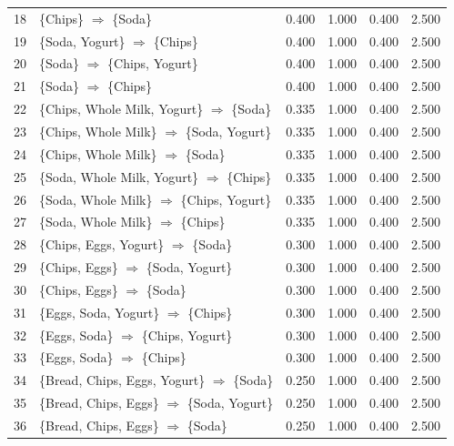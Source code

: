 \documentclass[12pt,letterpaper, onecolumn]{exam}
\begin{document}
\begin{questions}
\begin{solution}
{\begin{longtable}{|c|l|c|c|c|c|}
            18 & \{Chips\} $\Rightarrow$ \{Soda\} & 0.400 & 1.000 & 0.400 & 2.500 \\
            19 & \{Soda, Yogurt\} $\Rightarrow$ \{Chips\} & 0.400 & 1.000 & 0.400 & 2.500 \\
            20 & \{Soda\} $\Rightarrow$ \{Chips, Yogurt\} & 0.400 & 1.000 & 0.400 & 2.500 \\
            21 & \{Soda\} $\Rightarrow$ \{Chips\} & 0.400 & 1.000 & 0.400 & 2.500 \\
            22 & \{Chips, Whole Milk, Yogurt\} $\Rightarrow$ \{Soda\} & 0.335 & 1.000 & 0.400 & 2.500 \\
            23 & \{Chips, Whole Milk\} $\Rightarrow$ \{Soda, Yogurt\} & 0.335 & 1.000 & 0.400 & 2.500 \\
            24 & \{Chips, Whole Milk\} $\Rightarrow$ \{Soda\} & 0.335 & 1.000 & 0.400 & 2.500 \\
            25 & \{Soda, Whole Milk, Yogurt\} $\Rightarrow$ \{Chips\} & 0.335 & 1.000 & 0.400 & 2.500 \\
            26 & \{Soda, Whole Milk\} $\Rightarrow$ \{Chips, Yogurt\} & 0.335 & 1.000 & 0.400 & 2.500 \\
            27 & \{Soda, Whole Milk\} $\Rightarrow$ \{Chips\} & 0.335 & 1.000 & 0.400 & 2.500 \\
            28 & \{Chips, Eggs, Yogurt\} $\Rightarrow$ \{Soda\} & 0.300 & 1.000 & 0.400 & 2.500 \\
            29 & \{Chips, Eggs\} $\Rightarrow$ \{Soda, Yogurt\} & 0.300 & 1.000 & 0.400 & 2.500 \\
            30 & \{Chips, Eggs\} $\Rightarrow$ \{Soda\} & 0.300 & 1.000 & 0.400 & 2.500 \\
            31 & \{Eggs, Soda, Yogurt\} $\Rightarrow$ \{Chips\} & 0.300 & 1.000 & 0.400 & 2.500 \\
            32 & \{Eggs, Soda\} $\Rightarrow$ \{Chips, Yogurt\} & 0.300 & 1.000 & 0.400 & 2.500 \\
            33 & \{Eggs, Soda\} $\Rightarrow$ \{Chips\} & 0.300 & 1.000 & 0.400 & 2.500 \\
            34 & \{Bread, Chips, Eggs, Yogurt\} $\Rightarrow$ \{Soda\} & 0.250 & 1.000 & 0.400 & 2.500 \\
            35 & \{Bread, Chips, Eggs\} $\Rightarrow$ \{Soda, Yogurt\} & 0.250 & 1.000 & 0.400 & 2.500 \\
            36 & \{Bread, Chips, Eggs\} $\Rightarrow$ \{Soda\} & 0.250 & 1.000 & 0.400 & 2.500 \\

\end{longtable}}
\end{solution}
\end{questions}
\end{document}
